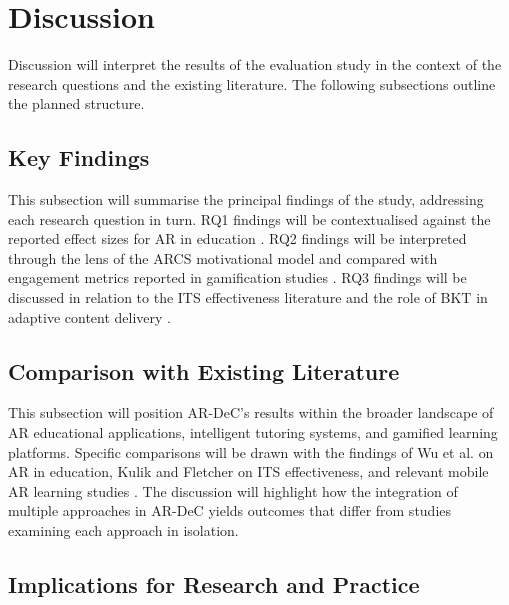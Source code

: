 
\section{Discussion}
\label{sec:discussion}

Discussion will interpret the results of the evaluation study in the context of the research questions and the existing literature. The following subsections outline the planned structure.

\subsection{Key Findings}
\label{subsec:key_findings}

This subsection will summarise the principal findings of the study, addressing each research question in turn. RQ1 findings will be contextualised against the reported effect sizes for AR in education \cite{garzonybarragan2020, aldokhny2022}. RQ2 findings will be interpreted through the lens of the ARCS motivational model and compared with engagement metrics reported in gamification studies \cite{deterding2011}. RQ3 findings will be discussed in relation to the ITS effectiveness literature \cite{kulik2016, vanlehn2011} and the role of BKT in adaptive content delivery \cite{corbett1994}.

\subsection{Comparison with Existing Literature}
\label{subsec:comparison_literature}

This subsection will position AR-DeC's results within the broader landscape of AR educational applications, intelligent tutoring systems, and gamified learning platforms. Specific comparisons will be drawn with the findings of Wu et al. \cite{wu2013} on AR in education, Kulik and Fletcher \cite{kulik2016} on ITS effectiveness, and relevant mobile AR learning studies \cite{ibanezmolina2018, parmaxi2020}. The discussion will highlight how the integration of multiple approaches in AR-DeC yields outcomes that differ from studies examining each approach in isolation.

\subsection{Implications for Research and Practice}
\label{subsec:implications}

